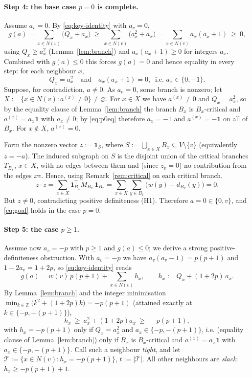 \documentclass[11pt]{article}
\newcommand{\bZ}{\mathbb{Z}}
\theoremstyle{definition}
\begin{document}
\paragraph{Step 4: the base case $p=0$ is complete.}
Assume $a_v=0$. By \eqref{eq:key-identity} with $a_v=0$,
\[
g(a)=\sum_{x\in N(v)}\bigl(Q_x+a_x\bigr)\ \ge\ \sum_{x\in N(v)}\bigl(a_x^2+a_x\bigr)
=\sum_{x\in N(v)}a_x(a_x+1)\ \ge\ 0,
\]
using $Q_x\ge a_x^2$ (Lemma~\ref{lem:branch}) and $a_x(a_x+1)\ge 0$ for integers $a_x$.
Combined with $g(a)\le 0$ this forces $g(a)=0$ and hence equality in every step: for each
neighbour $x$,
\begin{equation}\label{eq:p0eq}
Q_x=a_x^2\quad\text{and}\quad a_x(a_x+1)=0,\ \text{ i.e. } a_x\in\{0,-1\}.
\end{equation}
Suppose, for contradiction, $a\neq 0$. As $a_v=0$, some branch is nonzero; let
$X:=\{x\in N(v):a^{(x)}\neq 0\}\neq\varnothing$. For $x\in X$ we have $a^{(x)}\neq 0$ and
$Q_x=a_x^2$, so by the equality clause of Lemma~\ref{lem:branch} the branch $B_x$ is
$B_x$-critical and $a^{(x)}=a_x\mathbf 1$ with $a_x\neq 0$; by \eqref{eq:p0eq} therefore
$a_x=-1$ and $a^{(x)}=-\mathbf 1$ on all of $B_x$. For $x\notin X$, $a^{(x)}=0$.

Form the nonzero vector $z:=\mathbf 1_{S}$, where $S:=\bigcup_{x\in X}B_x\subseteq V\setminus\{v\}$
(equivalently $z=-a$). The induced subgraph on $S$ is the disjoint union of the critical
branches $T_{B_x}$, $x\in X$, with no edges between them and (since $z_v=0$) no
contribution from the edges $xv$. Hence, using Remark~\ref{rem:critical} on each critical
branch,
\[
z\cdot z=\sum_{x\in X}\mathbf 1_{B_x}^\top M_{B_x}\,\mathbf 1_{B_x}
=\sum_{x\in X}\sum_{y\in B_x}\bigl(w(y)-d_{B_x}(y)\bigr)=0.
\]
But $z\neq 0$, contradicting positive definiteness (H1). Therefore $a=0\in\{0,v\}$, and
\eqref{eq:goal} holds in the case $p=0$.

\paragraph{Step 5: the case $p\ge 1$.}
Assume now $a_v=-p$ with $p\ge 1$ and $g(a)\le 0$; we derive a strong
positive-definiteness obstruction. With $a_v=-p$ we have $a_v(a_v-1)=p(p+1)$ and
$1-2a_v=1+2p$, so \eqref{eq:key-identity} reads
\begin{equation}\label{eq:p-identity}
g(a)=w(v)\,p(p+1)+\sum_{x\in N(v)}h_x,\qquad h_x:=Q_x+(1+2p)\,a_x .
\end{equation}
By Lemma~\ref{lem:branch} and the integer minimisation
$\min_{k\in\bZ}\bigl(k^2+(1+2p)k\bigr)=-p(p+1)$ (attained exactly at $k\in\{-p,-(p+1)\}$),
\begin{equation}\label{eq:hx-lb}
h_x\ \ge\ a_x^2+(1+2p)a_x\ \ge\ -p(p+1),
\end{equation}
with $h_x=-p(p+1)$ only if $Q_x=a_x^2$ and $a_x\in\{-p,-(p+1)\}$, i.e. (equality clause of
Lemma~\ref{lem:branch}) only if $B_x$ is $B_x$-critical and $a^{(x)}=a_x\mathbf 1$ with
$a_x\in\{-p,-(p+1)\}$. Call such a neighbour \emph{tight}, and let
$\mathcal T:=\{x\in N(v): h_x=-p(p+1)\}$, $t:=|\mathcal T|$. All other neighbours are
\emph{slack}: $h_x\ge -p(p+1)+1$.
\end{document}
